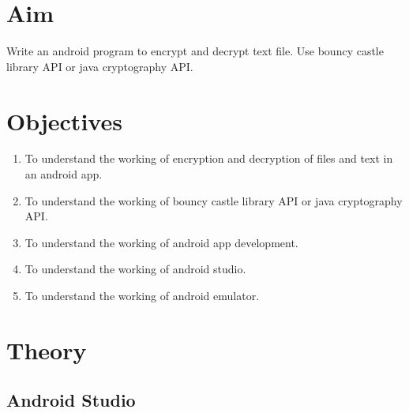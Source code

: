 \documentclass[11pt]{article}
\begin{document}
\tableofcontents
\thispagestyle{empty}
\clearpage

\setcounter{page}{1}

\section{Aim}
Write an android program to encrypt and decrypt text file. Use bouncy castle
library API or java cryptography API.

\section{Objectives}

\begin{enumerate}
    \item To understand the working of encryption and decryption of files and text in an
          android app.
    \item To understand the working of bouncy castle library API or java cryptography
          API.
    \item To understand the working of android app development.
    \item To understand the working of android studio.
    \item To understand the working of android emulator.
\end{enumerate}

\section{Theory}

\subsection{Android Studio}
\end{document}
